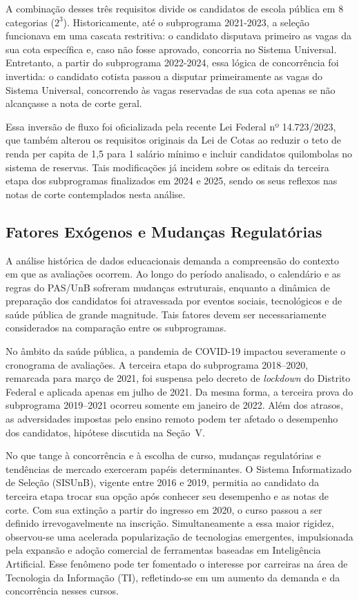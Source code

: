\documentclass[12pt]{article}
\begin{document}
A combinação desses três requisitos divide os candidatos de escola pública em 8 categorias ($2^3$). Historicamente, até o subprograma 2021-2023, a seleção funcionava em uma cascata restritiva: o candidato disputava primeiro as vagas da sua cota específica e, caso não fosse aprovado, concorria no Sistema Universal. Entretanto, a partir do subprograma 2022-2024, essa lógica de concorrência foi invertida: o candidato cotista passou a disputar primeiramente as vagas do Sistema Universal, concorrendo às vagas reservadas de sua cota apenas se não alcançasse a nota de corte geral.

Essa inversão de fluxo foi oficializada pela recente Lei Federal nº 14.723/2023, que também alterou os requisitos originais da Lei de Cotas ao reduzir o teto de renda per capita de 1,5 para 1 salário mínimo e incluir candidatos quilombolas no sistema de reservas. Tais modificações já incidem sobre os editais da terceira etapa dos subprogramas finalizados em 2024 e 2025, sendo os seus reflexos nas notas de corte contemplados nesta análise.

\subsection{Fatores Exógenos e Mudanças Regulatórias}

A análise histórica de dados educacionais demanda a compreensão do contexto em que as avaliações ocorrem. Ao longo do período analisado, o calendário e as regras do PAS/UnB sofreram mudanças estruturais, enquanto a dinâmica de preparação dos candidatos foi atravessada por eventos sociais, tecnológicos e de saúde pública de grande magnitude. Tais fatores devem ser necessariamente considerados na comparação entre os subprogramas.

No âmbito da saúde pública, a pandemia de COVID-19 impactou severamente o cronograma de avaliações. A terceira etapa do subprograma 2018--2020, remarcada para março de 2021, foi suspensa pelo decreto de \textit{lockdown} do Distrito Federal e aplicada apenas em julho de 2021. Da mesma forma, a terceira prova do subprograma 2019--2021 ocorreu somente em janeiro de 2022. Além dos atrasos, as adversidades impostas pelo ensino remoto podem ter afetado o desempenho dos candidatos, hipótese discutida na Seção~V.

No que tange à concorrência e à escolha de curso, mudanças regulatórias e tendências de mercado exerceram papéis determinantes. O Sistema Informatizado de Seleção (SISUnB), vigente entre 2016 e 2019, permitia ao candidato da terceira etapa trocar sua opção após conhecer seu desempenho e as notas de corte. Com sua extinção a partir do ingresso em 2020, o curso passou a ser definido irrevogavelmente na inscrição. Simultaneamente a essa maior rigidez, observou-se uma acelerada popularização de tecnologias emergentes, impulsionada pela expansão e adoção comercial de ferramentas baseadas em Inteligência Artificial. Esse fenômeno pode ter fomentado o interesse por carreiras na área de Tecnologia da Informação (TI), refletindo-se em um aumento da demanda e da concorrência nesses cursos.
\end{document}
